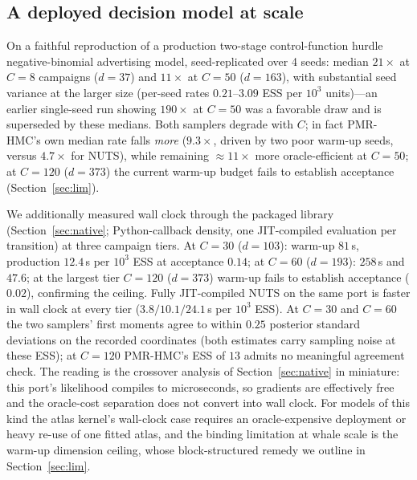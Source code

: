 \documentclass[11pt]{article}
\theoremstyle{remark}
\begin{document}
\subsection{A deployed decision model at scale}\label{sec:vilya}
On a faithful reproduction of a production two-stage control-function
hurdle negative-binomial advertising model, seed-replicated over 4
seeds: median $21\times$ at $C{=}8$ campaigns ($d{=}37$) and
$11\times$ at $C{=}50$ ($d{=}163$), with substantial seed variance at
the larger size (per-seed rates $0.21$--$3.09$ ESS per $10^3$
units)---an earlier single-seed run showing $190\times$ at $C{=}50$
was a favorable draw and is superseded by these medians. Both samplers
degrade with $C$; in fact PMR-HMC's own median rate falls
\emph{more} ($9.3\times$, driven by two poor warm-up seeds, versus
$4.7\times$ for NUTS), while remaining $\approx11\times$ more
oracle-efficient at $C{=}50$; at $C{=}120$ ($d{=}373$) the current
warm-up budget fails to establish acceptance (Section~\ref{sec:lim}).

We additionally measured wall clock through the packaged library
(Section~\ref{sec:native}; Python-callback density, one JIT-compiled
evaluation per transition) at three campaign tiers. At $C{=}30$
($d{=}103$): warm-up $81$\,s, production $12.4$\,s per $10^3$ ESS at
acceptance $0.14$; at $C{=}60$ ($d{=}193$): $258$\,s and $47.6$; at
the largest tier $C{=}120$ ($d{=}373$) warm-up fails to establish
acceptance ($0.02$), confirming the ceiling. Fully JIT-compiled NUTS
on the same port is faster in wall clock at every tier
($3.8/10.1/24.1$\,s per $10^3$ ESS). At $C{=}30$ and $C{=}60$ the two
samplers' first moments agree to within $0.25$ posterior standard
deviations on the recorded coordinates (both estimates carry sampling
noise at these ESS); at $C{=}120$ PMR-HMC's ESS of $13$ admits no
meaningful agreement check. The reading is the crossover analysis of
Section~\ref{sec:native} in miniature: this port's likelihood
compiles to microseconds, so gradients are effectively free and the
oracle-cost separation does not convert into wall clock. For models
of this kind the atlas kernel's wall-clock case requires an
oracle-expensive deployment or heavy re-use of one fitted atlas, and
the binding limitation at whale scale is the warm-up dimension
ceiling, whose block-structured remedy we outline in
Section~\ref{sec:lim}.
\end{document}
